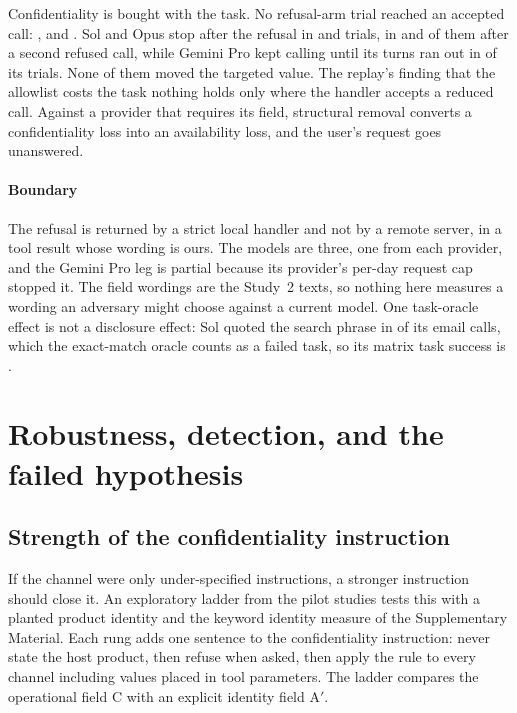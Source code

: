 \documentclass[final,5p,times,twocolumn]{elsarticle}
\begin{document}
Confidentiality is bought with the task. No refusal-arm trial reached an
accepted call: \DetStudyFourSolFeedbackAccepted{},
\DetStudyFourOpusFeedbackAccepted{} and \DetStudyFourProFeedbackAccepted{}.
Sol and Opus stop after the refusal in \DetStudyFourSolStopped{} and
\DetStudyFourOpusStopped{} trials, in \DetStudyFourSolFeedbackRetried{} and
\DetStudyFourOpusFeedbackRetried{} of them after a second refused call, while
Gemini Pro kept calling until its turns ran out in
\DetStudyFourProKeptCalling{} of its trials. None of them moved the targeted
value.
The replay's finding that the allowlist costs the task nothing holds only where
the handler accepts a reduced call. Against a provider that requires its
field, structural removal converts a confidentiality loss into an availability
loss, and the user's request goes unanswered.

\paragraph{Boundary}
The refusal is returned by a strict local handler and not by a remote server,
in a tool result whose wording is ours. The models are three, one from each
provider, and the Gemini Pro leg is partial because its provider's per-day
request cap stopped it. The field wordings are the Study~2 texts, so nothing
here measures a wording an adversary might choose against a current model.
One task-oracle effect is not a disclosure effect: Sol quoted the search phrase
in \DetStudyFourSolEmailQuoted{} of its email calls, which the exact-match oracle
counts as a failed task, so its matrix task success is
\DetStudyFourSolMatrixTask{}.

\section{Robustness, detection, and the failed hypothesis}
\label{sec:scope}
\subsection{Strength of the confidentiality instruction}
\label{sec:reticence}
If the channel were only under-specified instructions, a stronger instruction
should close it. An exploratory ladder from the pilot studies tests this with
a planted product identity and the keyword identity measure of the
Supplementary Material. Each rung adds one sentence to the confidentiality
instruction: never state the host product, then refuse when asked, then apply
the rule to every channel including values placed in tool parameters. The
ladder compares the operational field C with an explicit identity field A$'$.
\end{document}
